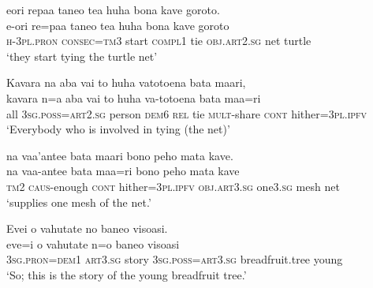 \ea\label{ex:text4-26}
eori repaa taneo tea huha bona kave goroto.\\
\gll e-ori	re=paa	taneo	tea	huha	bona	kave	goroto\\
     \textsc{h}-3\textsc{pl}.\textsc{pron}	\textsc{consec}=\textsc{tm}3	start	\textsc{compl}1	tie	\textsc{obj}.\textsc{art}2.\textsc{sg}	net	turtle\\
\glt `they start tying the turtle net'
\z

\newpage
\ea\label{ex:text4-27}
Kavara na aba vai to huha vatotoena bata maari,\\
\gll kavara	n=a	aba	vai	to	huha	va-totoena	bata	maa=ri\\
     all	3\textsc{sg}.\textsc{poss}=\textsc{art}2.\textsc{sg}	person	\textsc{dem}6	\textsc{rel}	tie	\textsc{mult}-share	\textsc{cont}	hither=3\textsc{pl}.\textsc{ipfv}\\
\glt `Everybody who is involved in tying (the net)'
\z

\ea\label{ex:text4-28}
na vaa'antee bata maari bono peho mata kave.\\
\gll na	vaa-antee	bata	maa=ri	bono	peho	mata	kave\\
     \textsc{tm}2	\textsc{caus}-enough	\textsc{cont}	hither=3\textsc{pl}.\textsc{ipfv}	\textsc{obj}.\textsc{art}3.\textsc{sg}	one3.\textsc{sg}	mesh	net\\
\glt `supplies one mesh of the net.'
\z

\ea\label{ex:text4-29}
Evei o vahutate no baneo visoasi.\\
\gll eve=i	o	vahutate	n=o	baneo	visoasi\\
     3\textsc{sg}.\textsc{pron}=\textsc{dem}1	\textsc{art}3.\textsc{sg}	story	3\textsc{sg}.\textsc{poss}=\textsc{art}3.\textsc{sg}	breadfruit.tree	young\\
\glt `So; this is the story of the young breadfruit tree.'
\z

